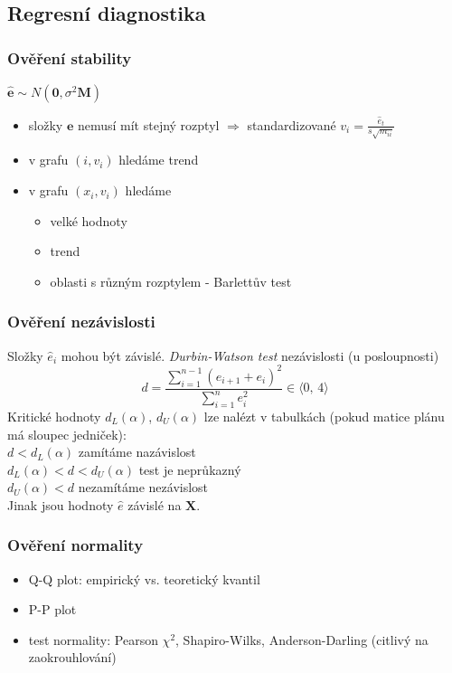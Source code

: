 \subsection{Regresní diagnostika}
\subsubsection{Ověření stability}
$\hat{\mathbf{e}} \sim N(\mathbf{0}, \sigma^{2} \mathbf{M})$

\begin{itemize}
    \item složky $\mathbf{e}$ nemusí mít stejný rozptyl $\Rightarrow$ standardizované $v_i = \frac{\hat{e}_t}{s \sqrt{m_{ii}}}$
    \item v grafu $(i, v_i)$ hledáme trend
    \item v grafu $(x_i, v_i)$ hledáme \begin{itemize}
    \item velké hodnoty
    \item trend
    \item oblasti s různým rozptylem - Barlettův test
    \end{itemize}
\end{itemize}
\subsubsection{Ověření nezávislosti}
Složky $\hat{e}_i$ mohou být závislé. 
\textit{Durbin-Watson test} nezávislosti (u posloupnosti) 
$$d = \frac{\sum_{i=1}^{n-1} \left( e_{i+1}+e_i\right) ^ 2}{\sum_{i=1}^{n} e_i ^ 2} \in \langle 0, \, 4 \rangle $$ Kritické hodnoty $d_L (\alpha)$, $d_U (\alpha)$ lze nalézt v tabulkách (pokud matice plánu má sloupec jedniček): \\
$d < d_L (\alpha)$ zamítáme nazávislost \\
$d_L (\alpha) < d < d_U (\alpha)$ test je neprůkazný \\
$d_U (\alpha) < d$ nezamítáme nezávislost \\
Jinak jsou hodnoty $\hat{e}$ závislé na $\mathbf{X}$. 

\subsubsection{Ověření normality}
\begin{itemize}
    \item Q-Q plot: empirický vs. teoretický kvantil 
    \item P-P plot
    \item test normality: Pearson $\chi ^2$, Shapiro-Wilks, Anderson-Darling (citlivý na zaokrouhlování) 
\end{itemize}


